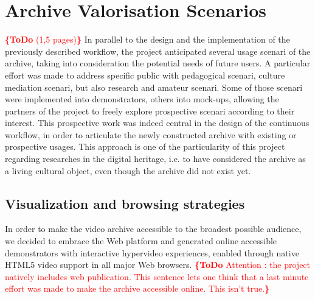 \documentclass[conference]{IEEEtran}
\newcommand{\todo}[1]{\noindent\textcolor{red}{{\bf \{ToDo} #1{\bf \}}}}
\begin{document}
\section{Archive Valorisation Scenarios}
\todo{(1,5 pages)}
In parallel to the design and the implementation of the previously described workflow, the project anticipated several usage scenari of the archive, taking into consideration the potential needs of future users. A particular effort was made to address specific public with pedagogical scenari, culture mediation scenari, but also research and amateur scenari. Some of those scenari were implemented into demonstrators, others into mock-ups, allowing the partners of the project to freely explore prospective scenari according to their interest.
This prospective work was indeed central in the design of the continuous workflow, in order to articulate the newly constructed archive with existing or prospective usages. This approach is one of the particularity of this project regarding researches in the digital heritage, i.e. to have considered the archive as a living cultural object, even though the archive did not exist yet.

\subsection{Visualization and browsing strategies}

In order to make the video archive accessible to the broadest possible audience, we decided to embrace the Web platform and generated online accessible demonstrators with interactive hypervideo experiences, enabled through native HTML5 video support in all major Web browsers.
\todo{Attention : the project natively includes web publication. This sentence lets one think that a last minute effort was made to make the archive accessible online. This isn't true.}
\end{document}
